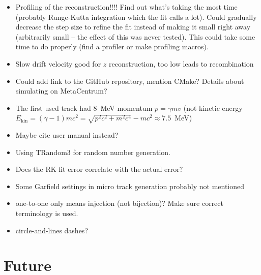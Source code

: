 {\begin{itemize}[topsep=4pt,itemsep=2pt]
				\item Profiling of the reconstruction!!!! Find out what's taking the most time (probably Runge-Kutta integration which the fit calls a lot). Could gradually decrease the step size to refine the fit instead of making it small right away (arbitrarily small -- the effect of this was never tested). This could take some time to do properly (find a profiler or make profiling macros).
				\item Slow drift velocity good for $z$ reconstruction, too low leads to recombination
				\item Could add link to the GitHub repository, mention CMake? Details about simulating on MetaCentrum?
				\item The first used track had 8~MeV momentum $p = \gamma m v$ (not kinetic energy $E_\text{kin} = (\gamma-1) m c^2 = \sqrt{p^2c^2+m^2c^4}-mc^2 \approx 7.5$~MeV)
				\item Maybe cite \garfieldpp user manual instead?
				\item Using TRandom3 for random number generation.
				\item Does the RK fit error correlate with the actual error?
				\item Some Garfield settings in micro track generation probably not mentioned
				\item one-to-one only means injection (not bijection)? Make sure correct terminology is used.
				\item circle-and-lines dashes?
			\end{itemize}
		}
	\section*{Future}
	
